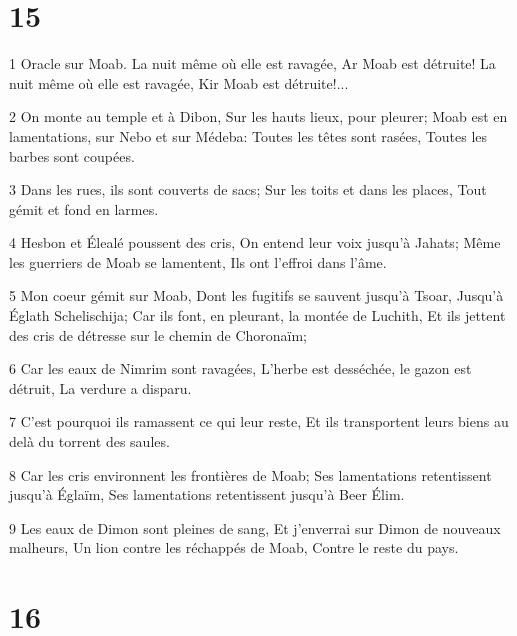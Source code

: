 \chapter{15}

\par 1 Oracle sur Moab. La nuit même où elle est ravagée, Ar Moab est détruite! La nuit même où elle est ravagée, Kir Moab est détruite!...
\par 2 On monte au temple et à Dibon, Sur les hauts lieux, pour pleurer; Moab est en lamentations, sur Nebo et sur Médeba: Toutes les têtes sont rasées, Toutes les barbes sont coupées.
\par 3 Dans les rues, ils sont couverts de sacs; Sur les toits et dans les places, Tout gémit et fond en larmes.
\par 4 Hesbon et Élealé poussent des cris, On entend leur voix jusqu'à Jahats; Même les guerriers de Moab se lamentent, Ils ont l'effroi dans l'âme.
\par 5 Mon coeur gémit sur Moab, Dont les fugitifs se sauvent jusqu'à Tsoar, Jusqu'à Églath Schelischija; Car ils font, en pleurant, la montée de Luchith, Et ils jettent des cris de détresse sur le chemin de Choronaïm;
\par 6 Car les eaux de Nimrim sont ravagées, L'herbe est desséchée, le gazon est détruit, La verdure a disparu.
\par 7 C'est pourquoi ils ramassent ce qui leur reste, Et ils transportent leurs biens au delà du torrent des saules.
\par 8 Car les cris environnent les frontières de Moab; Ses lamentations retentissent jusqu'à Églaïm, Ses lamentations retentissent jusqu'à Beer Élim.
\par 9 Les eaux de Dimon sont pleines de sang, Et j'enverrai sur Dimon de nouveaux malheurs, Un lion contre les réchappés de Moab, Contre le reste du pays.

\chapter{16}

